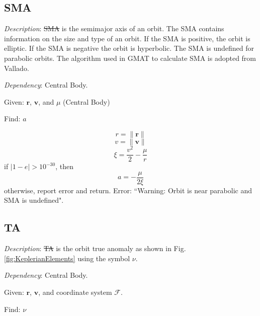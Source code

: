 \subsection{SMA} 

\noindent \textit{Description}: \st{SMA} is the semimajor axis  of
an orbit. The SMA contains information on the size and type of an
orbit.  If the SMA is positive, the orbit is elliptic.  If the SMA
is negative the orbit is hyperbolic.  The SMA is undefined for
parabolic orbits. The algorithm used in GMAT to calculate SMA is
adopted from Vallado\cite{vallado2}.

\noindent \textit{Dependency}:  Central Body.

\noindent Given:  $\mathbf{r}$, $\mathbf{v}$, and $\mu$ (Central
Body)

\noindent Find:  $a$


%
\begin{equation}
    r = \| \mathbf{r} \|
\end{equation}
%
\begin{equation}
    v = \| \mathbf{v} \|
\end{equation}
%
\begin{equation}
     \xi = \frac{v^2}{2} - \frac{\mu}{r}
\end{equation}
%
if $|1 - e| > 10^{-30}$, then
\begin{equation}
     a = -\frac{\mu}{2\xi}
\end{equation}
%
otherwise, report  error and return.  Error: ``Warning: Orbit is
near parabolic and SMA is undefined".

\subsection{TA} 

\noindent \textit{Description}: \st{TA} is the orbit true anomaly as
shown in Fig. \ref{fig:KeplerianElements} using the symbol $\nu$.

\noindent \textit{Dependency}:  Central Body.

\noindent Given:  $\mathbf{r}$, $\mathbf{v}$, and coordinate system
$\mathcal{F}$.

\noindent Find:  $\nu$

